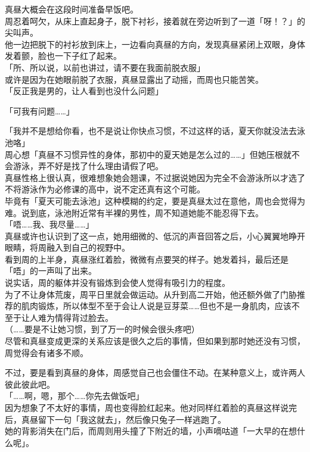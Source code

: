真昼大概会在这段时间准备早饭吧。\\

周忍着呵欠，从床上直起身子，脱下衬衫，接着就在旁边听到了一道「呀！？」的尖叫声。\\

他一边把脱下的衬衫放到床上，一边看向真昼的方向，发现真昼紧闭上双眼，身体发着颤，脸也一下子红了起来。\\

「所、所以说，以前也讲过，请不要在我面前脱衣服」\\

或许是因为在她眼前脱了衣服，真昼显露出了动摇，而周也只能苦笑。\\

「反正我是男的，让人看到也没什么问题」

「可我有问题……」

「我并不是想给你看，也不是说让你快点习惯，不过这样的话，夏天你就没法去泳池咯」\\

周心想「真昼不习惯异性的身体，那初中的夏天她是怎么过的……」但她压根就不会游泳，弄不好是找了什么理由请假了吧。\\

真昼性格上很认真，很难想象她会翘课，不过据说她因为完全不会游泳所以才选了不将游泳作为必修课的高中，说不定还真有这个可能。\\

毕竟有「夏天可能去泳池」这种模糊的约定，要是真昼太过在意他，周也会觉得为难。说到底，泳池附近常有半裸的男性，周不知道她能不能忍得下去。\\

「唔……我、我尽量……」\\

真昼或许也认识到了这一点，她用细微的、低沉的声音回答之后，小心翼翼地睁开眼睛，将周融入到自己的视野中。\\

看到周的上半身，真昼涨红着脸，微微有点要哭的样子。她发着抖，最后还是「唔」的一声叫了出来。\\

说实话，周的躯体并没有锻炼到会使人觉得有吸引力的程度。\\

为了不让身体荒废，周平日里就会做运动。从升到高二开始，他还额外做了门胁推荐的肌肉锻炼，所以体型不至于会让人说是豆芽菜……但也不是一身肌肉，应该不至于让人难为情得背过脸去。\\

（……要是不让她习惯，到了万一的时候会很头疼吧）\\

尽管和真昼变成更深的关系应该是很久之后的事情，但如果到那时她还没有习惯，周觉得会有诸多不顺。

不过，要是看到真昼的身体，周感觉自己也会僵住不动。在某种意义上，或许两人彼此彼此吧。\\

「……啊，嗯，那个……你先去做饭吧」\\

因为想象了不太好的事情，周也变得脸红起来。他对同样红着脸的真昼这样说完后，真昼留下一句「我这就去」，然后像只兔子一样逃跑了。\\

她的背影消失在门后，而周则用头撞了下附近的墙，小声嘀咕道「一大早的在想什么呢」。
